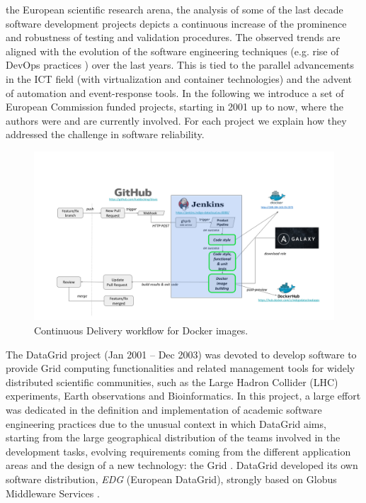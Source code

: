 \documentclass[journal]{IEEEtran}
\begin{document}
 the European scientific research arena, the analysis of some of the last decade software development projects depicts a continuous increase of the prominence and robustness of testing and validation procedures. The observed trends are aligned with the evolution of the software engineering techniques (e.g. rise of DevOps practices \cite{devops}) over the last years. This is tied to the parallel advancements in the ICT field (with virtualization and container technologies) and the advent of automation and event-response tools. In the following we introduce a set of European Commission funded projects, starting in 2001 up to now, where the authors were and are currently involved. For each project we explain how they addressed the challenge in software reliability.

\begin{figure}
\centering
\includegraphics[width=\textwidth]{images/devops.png}
\caption{Continuous Delivery workflow for Docker images.}
\label{fig:fig_CD}
\end{figure}

The DataGrid \cite{cordis:datagrid} project (Jan 2001 -- Dec 2003) was devoted to develop software to provide Grid computing functionalities and related management tools for widely distributed scientific communities, such as the Large Hadron Collider (LHC) experiments, Earth observations and Bioinformatics. In this project, a large effort was dedicated in the definition and implementation of academic software engineering practices due to the unusual context in which DataGrid aims, starting from the large geographical distribution of the teams involved in the development tasks, evolving requirements coming from the different application areas and the design of a new technology: the Grid \cite{datagrid}. DataGrid developed its own software distribution, {\sl EDG} (European DataGrid), strongly based on Globus Middleware Services \cite{globus}.
\end{document}
